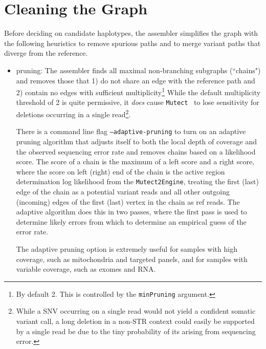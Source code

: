\documentclass[nofootinbib,amssymb,amsmath]{revtex4}
\newcommand{\Mutect}{\texttt{Mutect}}
\newcommand{\code}[1]{\texttt{#1}}
\begin{document}
\section{Cleaning the Graph} \label{graph-cleaning}
Before deciding on candidate haplotypes, the assembler simplifies the graph with the following heuristics to remove spurious paths and to merge variant paths that diverge from the reference.
\begin{itemize}
\item pruning: The assembler finds all maximal non-branching subgraphs (``chains") and removes those that 1) do not share an edge with the reference path and 2) contain no edges with sufficient multiplicity\footnote{By default 2.  This is controlled by the \code{minPruning} argument.}  While the default multiplicity threshold of 2 is quite permissive, it \textit{does} cause \Mutect~ to lose sensitivity for deletions occurring in a single read\footnote{While a SNV occurring on a single read would not yield a confident somatic variant call, a long deletion in a non-STR context could easily be supported by a single read be due to the tiny probability of its arising from sequencing error.}.

There is a command line flag \code{--adaptive-pruning} to turn on an adaptive pruning algorithm that adjusts itself to both the local depth of coverage and the observed sequencing error rate and removes chains based on a likelihood score.  The score of a chain is the maximum of a left score and a right score, where the score on left (right) end of the chain is the active region determination log likelihood from the \code{Mutect2Engine}, treating the first (last) edge of the chain as a potential variant reads and all other outgoing (incoming) edges of the first (last) vertex in the chain as ref reads.  The adaptive algorithm does this in two passes, where the first pass is used to determine likely errors from which to determine an empirical guess of the error rate.

The adaptive pruning option is extremely useful for samples with high coverage, such as mitochondria and targeted panels, and for samples with variable coverage, such as exomes and RNA.


\end{itemize}
\end{document}
